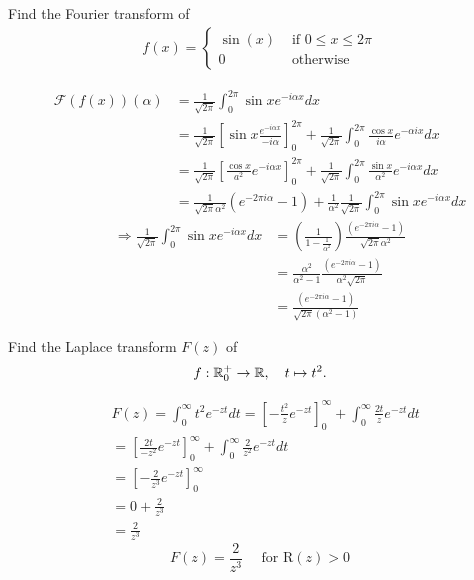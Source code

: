 \documentclass[11pt]{article}
\begin{document}
\begin{exercise}
    Find the Fourier transform of 
    \begin{align*}
        f(x) = \left\{\begin{array}{ll}
                \sin(x) & \text{ if } 0 \leq x \leq 2 \pi 
                \\
                0 & \text{ otherwise }
               \end{array}
               \right.
    \end{align*}
\end{exercise}
\begin{solution} 
$$\begin{aligned} \mathcal{F}(f(x))(\alpha) & =\frac{1}{\sqrt{2 \pi}} \int_0^{2 \pi} \sin x e^{-i \alpha x} d x \\ & =\frac{1}{\sqrt{2 \pi}}\left[\sin x \frac{e^{-i \alpha x}}{-i \alpha}\right]_0^{2 \pi}+\frac{1}{\sqrt{2 \pi}} \int_0^{2 \pi} \frac{\cos x}{i \alpha} e^{-\alpha i x} d x \\ & =\frac{1}{\sqrt{2 \pi}}\left[\frac{\cos x}{a^2} e^{-i \alpha x}\right]_0^{2 \pi}+\frac{1}{\sqrt{2 \pi}} \int_0^{2 \pi} \frac{\sin x}{\alpha^2} e^{-i \alpha x} d x \\ & =\frac{1}{\sqrt{2 \pi} \alpha^2}\left(e^{-2 \pi i \alpha}-1\right)+\frac{1}{\alpha^2} \frac{1}{\sqrt{2 \pi}} \int_0^{2 \pi} \sin x e^{-i \alpha x} d x\end{aligned}$$
$$
\begin{aligned} \Rightarrow \frac{1}{\sqrt{2 \pi}} \int_0^{2 \pi} \sin x e^{-i \alpha x} d x & =\left(\frac{1}{1-\frac{1}{\alpha^2}}\right) \frac{\left(e^{-2 \pi i \alpha}-1\right)}{\sqrt{2 \pi} \alpha^2} \\ & =\frac{\alpha^2}{\alpha^2-1} \frac{\left(e^{-2 \pi i \alpha}-1\right)}{\alpha^2 \sqrt{2 \pi}} \\ & =\frac{\left(e^{-2 \pi i \alpha}-1\right)}{\sqrt{2 \pi}\left(\alpha^2-1\right)}\end{aligned}
$$
\end{solution}

\begin{exercise}
    Find the Laplace transform $F(z)$ of 
    \begin{align*}
        f : \mathbb{R}_{0}^{+} \to \mathbb{R}, \quad t \mapsto t^{2}.
    \end{align*}
\end{exercise}
\begin{solution}     
$$\begin{aligned} & F(z)=\int_0^{\infty} t^2 e^{-z t} d t=\left[-\frac{t^2}{z} e^{-z t}\right]_0^{\infty}+\int_0^{\infty} \frac{2 t}{z} e^{-z t} d t \\ &=\left[\frac{2 t}{-z^2} e^{-z t}\right]_0^{\infty}+\int_0^{\infty} \frac{2}{z^2} e^{-z t} d t \\ &=\left[-\frac{2}{z^3} e^{-z t}\right]_0^{\infty} \\ &=0+\frac{2}{z^3} \\ &=\frac{2}{z^3}\end{aligned}$$
$$
F(z)=\frac{2}{z^3} \quad \text { for } \mathrm{R}(z)>0
$$
\end{solution}
\end{document}
